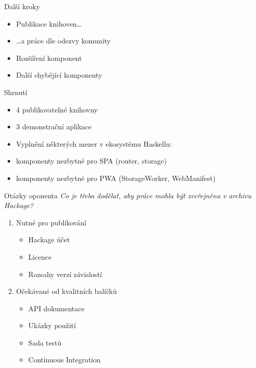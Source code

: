 \documentclass[presentation]{beamer}
\begin{document}
\begin{frame}{Další kroky}
  \begin{itemize}
    \item Publikace knihoven\ldots
    \item \ldots{}a práce dle odezvy komunity
    \medskip
    \item Rozšíření komponent
    \item Další chybějící komponenty
  \end{itemize}
\end{frame}

\begin{frame}{Shrnutí}
  \begin{itemize}
    \item 4 publikovatelné knihovny
    \item 3 demonstrační aplikace
    \medskip
    \item Vyplnění některých mezer v ekosystému Haskellu:
    \item komponenty nezbytné pro SPA (router, storage)
    \item komponenty nezbytné pro PWA (StorageWorker, WebManifest)
  \end{itemize}
\end{frame}


\appendix
\begin{frame}{Otázky oponenta}
  \emph{Co je třeba dodělat, aby práce mohla být zveřejněna v archivu Hackage?}
  \medskip
  \begin{enumerate}
    \item Nutné pro publikování
      \begin{itemize}
        \item Hackage účet
        \item Licence
        \item Rozsahy verzí závislostí
      \end{itemize}
    \item Očekávané od kvalitních balíčků
      \begin{itemize}
        \item API dokumentace
        \item Ukázky použití
        \item Sada testů
        \item Continuous Integration
      \end{itemize}
  \end{enumerate}
\end{frame}
\end{document}
